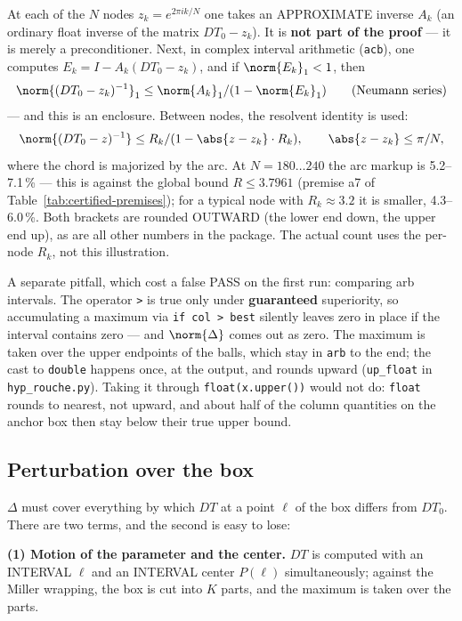 At each of the $N$ nodes $z_k = e^{2\pi i k/N}$ one takes an APPROXIMATE
inverse $A_k$ (an ordinary float inverse of the matrix $DT_{0} - z_k$). It is
\textbf{not part of the proof} --- it is merely a preconditioner. Next, in complex
interval arithmetic (\texttt{acb}), one computes $E_k = I - A_k(DT_{0} - z_k)$, and
if $\norm{E_k}_{1} < 1$, then
\[
\norm{(DT_{0} - z_k)^{-1}}_{1} \le \norm{A_k}_{1} / (1 - \norm{E_k}_{1}) \qquad \text{(Neumann series)}
\]
--- and this is an enclosure. Between nodes, the resolvent identity is used:
\[
\norm{(DT_{0} - z)^{-1}} \le R_k / (1 - \abs{z - z_k}\cdot R_k), \qquad \abs{z - z_k} \le \pi/N,
\]
where the chord is majorized by the arc. At $N = 180\dots 240$ the arc markup is
5.2--7.1\,\% --- this is against the global bound $R \le 3.7961$ (premise a7 of
Table~\ref{tab:certified-premises}); for a
typical node with $R_k \approx 3.2$ it is smaller, 4.3--6.0\,\%. Both brackets are
rounded OUTWARD (the lower end down, the upper end up), as are all other
numbers in the package. The actual count uses the per-node $R_k$, not this
illustration.

A separate pitfall, which cost a false PASS on the first run: comparing
arb intervals. The operator \texttt{>} is true only under \textbf{guaranteed}
superiority, so accumulating a maximum via \texttt{if col > best} silently leaves
zero in place if the interval contains zero --- and $\norm{\Delta}$ comes out as zero.
The maximum is taken over the upper endpoints of the balls, which stay in
\texttt{arb} to the end; the cast to \texttt{double} happens once, at the
output, and rounds upward (\texttt{up\_\allowbreak float} in
\texttt{hyp\_\allowbreak rouche.py}). Taking it through
\texttt{float(x.upper())} would not do: \texttt{float} rounds to nearest, not
upward, and about half of the column quantities on the anchor box then stay
below their true upper bound.


\subsection{Perturbation over the box}\label{sec:4.5}

$\Delta$ must cover everything by which $DT$ at a point $\ell$ of the box differs
from $DT_{0}$. There are two terms, and the second is easy to lose:

\textbf{(1) Motion of the parameter and the center.} $DT$ is computed with an
INTERVAL $\ell$ and an INTERVAL center $P(\ell)$ simultaneously; against the
Miller wrapping, the box is cut into $K$ parts, and the maximum is taken
over the parts.

